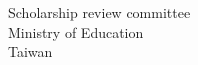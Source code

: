 \documentclass[12pt, a4paper]{simref} %
\begin{document}
\begin{letter}{
	Scholarship review committee\\
	Ministry of Education\\
	Taiwan\\
}



\end{letter}
\end{document}
